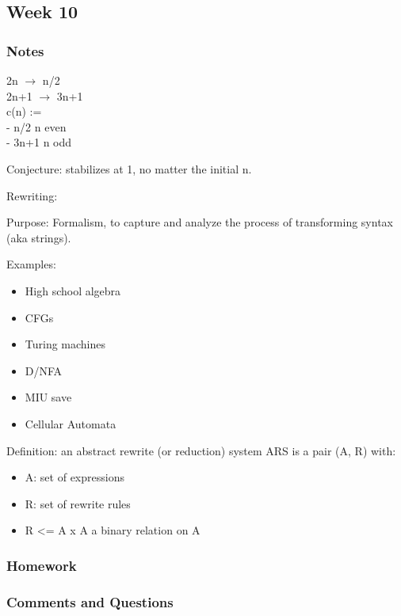 \documentclass{article}
\theoremstyle{theorem}
\theoremstyle{definition}
\theoremstyle{remark}
\begin{document}
\subsection{Week 10}

\subsubsection*{Notes}

2n $\rightarrow$ n/2 \\
2n+1 $\rightarrow$ 3n+1 \\

c(n) := { \\
  - n/2 n even \\
  - 3n+1 n odd \\
  }

Conjecture: stabilizes at 1, no matter the initial n.

Rewriting:

Purpose:
Formalism, to capture and analyze the process of transforming syntax (aka strings).

Examples: \\
\begin{itemize}
  \item High school algebra
  \item CFGs
  \item Turing machines
  \item D/NFA
  \item MIU save
  \item Cellular Automata
\end{itemize}

Definition: an abstract rewrite (or reduction) system ARS is a pair (A, R) with: \\
\begin{itemize}
  \item A: set of expressions
  \item R: set of rewrite rules
  \item R <= A x A a binary relation on A
\end{itemize}

\subsubsection*{Homework}

\subsubsection*{Comments and Questions}
\end{document}

